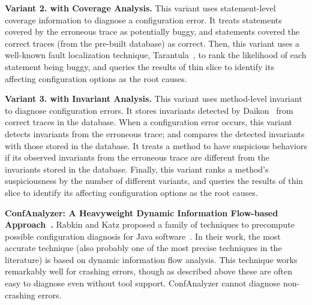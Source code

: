 
\vspace{1mm}
\noindent \textbf{Variant 2. \ourtool with Coverage Analysis.}
This variant uses statement-level coverage information
to diagnose a configuration error. It treats statements covered
by the erroneous trace as potentially buggy, and statements
covered the correct traces (from the pre-built database) as correct.
Then, this variant uses a well-known fault localization technique,
Tarantula~\cite{Jones:2002}, to rank the likelihood of each
statement being buggy, and queries the results of thin slice
to identify its affecting configuration options as the root causes. 


\vspace{1mm}
\noindent \textbf{Variant 3. \ourtool with Invariant Analysis.}
This variant uses method-level invariant
to diagnose configuration errors. It stores invariants detected
by Daikon~\cite{Ernst:1999} from correct traces in the database. When a configuration
error occurs, this variant detects invariants from the erroneous trace;
and compares the detected invariants
with those stored in the database.
It treats a method to have suspicious behaviors if its observed invariants
from the erroneous trace are different from the invariants stored in the database. Finally, this variant ranks
a method's suspiciousness by the number of different variants, and
queries the results of thin slice
to identify its affecting configuration options as the root causes. 

\vspace{1mm}
\noindent \textbf{ConfAnalyzer: A Heavyweight Dynamic Information Flow-based Approach~\cite{Rabkin:2011:PPC}.}
Rabkin and Katz proposed a family of techniques to precompute possible
configuration diagnosis for Java software~\cite{Rabkin:2011:PPC}. In their work,
the most accurate technique (also probably one of the most precise techniques in the literature)
is based on dynamic information flow analysis.
This technique works remarkably well for crashing errors, though as
described above these are often easy to diagnose even without tool
support.  ConfAnalyzer cannot diagnose non-crashing errors.

